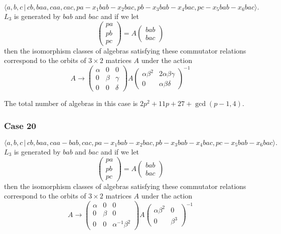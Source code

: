 \documentclass[10pt]{article}
\begin{document}
\begin{equation}
\langle
a,b,c\,|%
\,cb,baa,caa,cac,pa-x_{1}bab-x_{2}bac,pb-x_{3}bab-x_{4}bac,pc-x_{5}bab-x_{6}bac\rangle .
\tag{7.775}
\end{equation}%
$L_{3}$ is generated by $bab$ and $bac$ and if we let 
\[
\left( 
\begin{array}{l}
pa \\ 
pb \\ 
pc%
\end{array}%
\right) =A\left( 
\begin{array}{l}
bab \\ 
bac%
\end{array}%
\right) 
\]%
then the isomorphism classes of algebras satisfying these commutator
relations correspond to the orbits of $3\times 2$ matrices $A$ under the
action 
\[
A\rightarrow \left( 
\begin{array}{lll}
\alpha & 0 & 0 \\ 
0 & \beta & \gamma \\ 
0 & 0 & \delta%
\end{array}%
\right) A\left( 
\begin{array}{ll}
\alpha \beta ^{2} & 2\alpha \beta \gamma \\ 
0 & \alpha \beta \delta%
\end{array}%
\right) ^{-1} 
\]%
$\allowbreak $

The total number of algebras in this case is $2p^{2}+11p+27+\gcd (p-1,4)$.

\subsubsection{Case 20}

\begin{equation}
\langle
a,b,c\,|%
\,cb,baa,caa-bab,cac,pa-x_{1}bab-x_{2}bac,pb-x_{3}bab-x_{4}bac,pc-x_{5}bab-x_{6}bac\rangle .
\tag{7.776}
\end{equation}%
$L_{3}$ is generated by $bab$ and $bac$ and if we let 
\[
\left( 
\begin{array}{l}
pa \\ 
pb \\ 
pc%
\end{array}%
\right) =A\left( 
\begin{array}{l}
bab \\ 
bac%
\end{array}%
\right) 
\]%
then the isomorphism classes of algebras satisfying these commutator
relations correspond to the orbits of $3\times 2$ matrices $A$ under the
action 
\[
A\rightarrow \left( 
\begin{array}{lll}
\alpha & 0 & 0 \\ 
0 & \beta & 0 \\ 
0 & 0 & \alpha ^{-1}\beta ^{2}%
\end{array}%
\right) A\left( 
\begin{array}{ll}
\alpha \beta ^{2} & 0 \\ 
0 & \beta ^{3}%
\end{array}%
\right) ^{-1} 
\]
\end{document}
